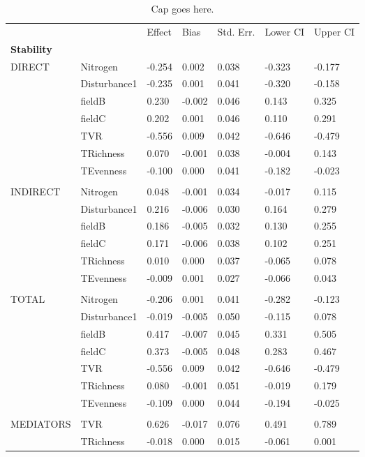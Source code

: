 \begin{longtable}[c]{l l l l l l l }
\caption{Cap goes here. \label{tbl:table-name}}\\
 & & Effect & Bias & Std.  Err. & Lower  CI & Upper  CI\\
\textbf{Stability} &  &  &  &  &  &\\
\hline
 DIRECT & Nitrogen & -0.254 & 0.002 & 0.038 & -0.323 & -0.177\\
 & Disturbance1 & -0.235 & 0.001 & 0.041 & -0.320 & -0.158\\
 & fieldB & 0.230 & -0.002 & 0.046 & 0.143 & 0.325\\
 & fieldC & 0.202 & 0.001 & 0.046 & 0.110 & 0.291\\
 & TVR & -0.556 & 0.009 & 0.042 & -0.646 & -0.479\\
 & TRichness & 0.070 & -0.001 & 0.038 & -0.004 & 0.143\\
 & TEvenness & -0.100 & 0.000 & 0.041 & -0.182 & -0.023\\
 & & & & & & \\
 INDIRECT & Nitrogen & 0.048 & -0.001 & 0.034 & -0.017 & 0.115\\
 & Disturbance1 & 0.216 & -0.006 & 0.030 & 0.164 & 0.279\\
 & fieldB & 0.186 & -0.005 & 0.032 & 0.130 & 0.255\\
 & fieldC & 0.171 & -0.006 & 0.038 & 0.102 & 0.251\\
 & TRichness & 0.010 & 0.000 & 0.037 & -0.065 & 0.078\\
 & TEvenness & -0.009 & 0.001 & 0.027 & -0.066 & 0.043\\
 & & & & & & \\
 TOTAL & Nitrogen & -0.206 & 0.001 & 0.041 & -0.282 & -0.123\\
 & Disturbance1 & -0.019 & -0.005 & 0.050 & -0.115 & 0.078\\
 & fieldB & 0.417 & -0.007 & 0.045 & 0.331 & 0.505\\
 & fieldC & 0.373 & -0.005 & 0.048 & 0.283 & 0.467\\
 & TVR & -0.556 & 0.009 & 0.042 & -0.646 & -0.479\\
 & TRichness & 0.080 & -0.001 & 0.051 & -0.019 & 0.179\\
 & TEvenness & -0.109 & 0.000 & 0.044 & -0.194 & -0.025\\
 & & & & & & \\
 MEDIATORS &TVR & 0.626 & -0.017 & 0.076 & 0.491 & 0.789\\
 & TRichness & -0.018 & 0.000 & 0.015 & -0.061 & 0.001\\

\end{longtable}
